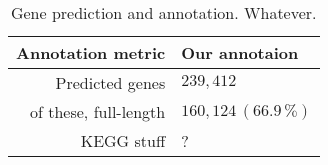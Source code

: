 \documentclass{bmcart}
\begin{document}
\begin{backmatter}
\begin{table}[h!]
\caption{Gene prediction and annotation. Whatever.}
\begin{tabular}{rl}
\hline
Annotation metric & Our annotaion\\
\hline
Predicted genes & $239,412$\\
of these, full-length & $160,124\,(66.9\,\%)$\\
KEGG stuff & ?\\
\hline
\end{tabular}
\label{tGenes}
\end{table}


%


\end{backmatter}
\newpage
\listoftodos
\end{document}

